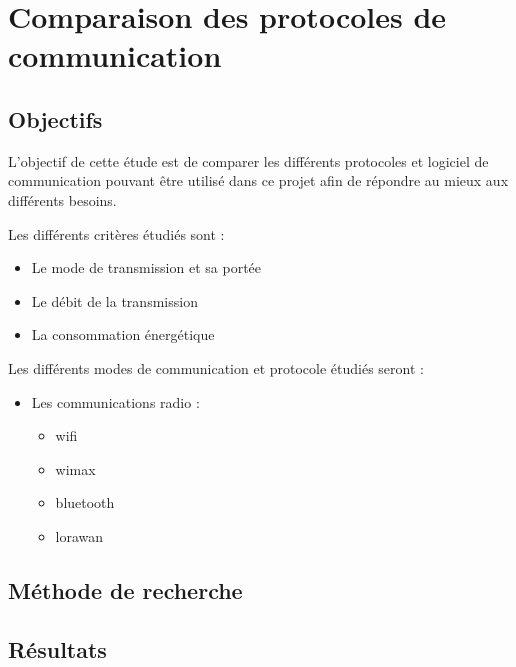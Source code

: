 \section{Comparaison des protocoles de communication}
\label{sec:comparaisonProtocoleCommnunication}

\subsection{Objectifs}
\label{sec:comparaisonProtocoleCommnunicationObjectifs}

L'objectif de cette étude est de comparer les différents protocoles et logiciel de communication
pouvant être utilisé dans ce projet afin de répondre au mieux aux différents besoins.\newline

Les différents critères étudiés sont :

\begin{itemize}
    \item Le mode de transmission et sa portée
    \item Le débit de la transmission
    \item La consommation énergétique
\end{itemize}

Les différents modes de communication et protocole étudiés seront :

\begin{itemize}
    \item Les communications radio :
          \begin{itemize}
              \item \gls{wifi}
              \item \gls{wimax}
              \item \gls{bluetooth}
              \item \gls{lorawan}
          \end{itemize}
\end{itemize}

\subsection{Méthode de recherche}
\label{sec:comparaisonProtocoleCommnunicationMethode}

\subsection{Résultats}
\label{sec:comparaisonProtocoleCommnunicationResultats}

